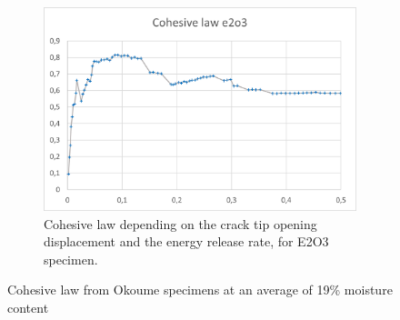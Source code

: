 \begin{figure}[H]
\begin{subfigure}{0.48\linewidth}
	\centering
	\includegraphics[scale=0.6]{Figures/e2o3_colaw}
	\decoRule
	\caption[Cohesive law from E1O3 specimen]{Cohesive law depending on the crack tip opening displacement and the energy release rate, for E2O3 specimen.}
	\label{fig:E2O3_colaw}
\end{subfigure}
\caption{Cohesive law from Okoume specimens at an average of 19\% moisture content}
\label{E2o_colaw}
\end{figure}
\newpage
